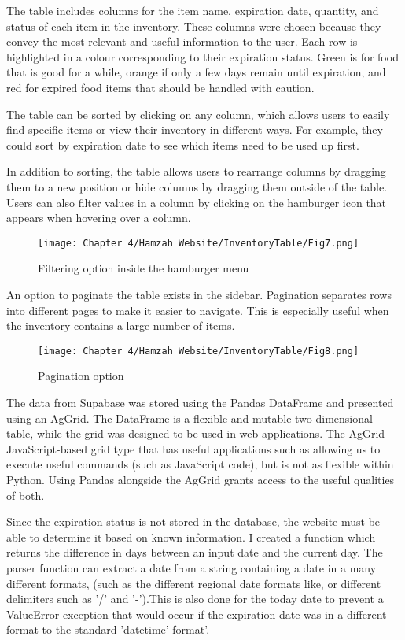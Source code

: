 The table includes columns for the item name, expiration date, quantity, and status of each item in the inventory.
These columns were chosen because they convey the most relevant and useful information to the user.
Each row is highlighted in a colour corresponding to their expiration status.
Green is for food that is good for a while, orange if only a few days remain until expiration, and red for expired food items that should be handled with caution.

The table can be sorted by clicking on any column, which allows users to easily find specific items or view their inventory in different ways.
For example, they could sort by expiration date to see which items need to be used up first.

In addition to sorting, the table allows users to rearrange columns by dragging them to a new position or hide columns by dragging them outside of the table.
Users can also filter values in a column by clicking on the hamburger icon that appears when hovering over a column.

\begin{figure}[H]        
    \centering
    \texttt{[image: Chapter 4/Hamzah Website/InventoryTable/Fig7.png]}
    \caption{Filtering option inside the hamburger menu}
\end{figure} 

An option to paginate the table exists in the sidebar.
Pagination separates rows into different pages to make it easier to navigate.
This is especially useful when the inventory contains a large number of items.

\begin{figure}[H]        
    \centering
    \texttt{[image: Chapter 4/Hamzah Website/InventoryTable/Fig8.png]}
    \caption{Pagination option}
\end{figure} 

The data from Supabase was stored using the Pandas DataFrame and presented using an AgGrid.
The DataFrame is a flexible and mutable two-dimensional table, while the grid was designed to be used in web applications.
The AgGrid JavaScript-based grid type that has useful applications such as allowing us to execute useful commands (such as JavaScript code), but is not as flexible within Python.
Using Pandas alongside the AgGrid grants access to the useful qualities of both.

Since the expiration status is not stored in the database, the website must be able to determine it based on known information.
I created a function which returns the difference in days between an input date and the current day.
The parser function can extract a date from a string containing a date in a many different formats, (such as the different regional date formats like, or different delimiters such as '/' and '-').This is also done for the today date to prevent a ValueError exception that would occur if the expiration date was in a different format to the standard 'datetime' format'.

